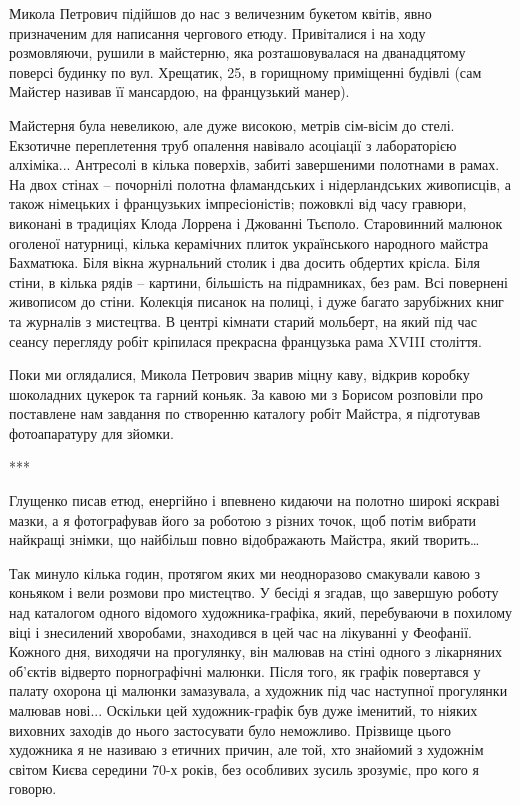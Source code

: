 Микола Петрович підійшов до нас з величезним букетом квітів, явно призначеним
для написання чергового етюду. Привіталися і на ходу розмовляючи, рушили в
майстерню, яка розташовувалася на дванадцятому поверсі будинку по вул.
Хрещатик, 25, в горищному приміщенні будівлі (сам Майстер називав її мансардою,
на французький манер).


Майстерня була невеликою, але дуже високою, метрів сім-вісім до стелі.
Екзотичне переплетення труб опалення навівало асоціації з лабораторією
алхіміка... Антресолі в кілька поверхів, забиті завершеними полотнами в рамах.
На двох стінах – почорнілі полотна фламандських і нідерландських живописців, а
також німецьких і французьких імпресіоністів; пожовклі від часу гравюри,
виконані в традиціях Клода Лоррена і Джованні Тьєполо. Старовинний малюнок
оголеної натурниці, кілька керамічних плиток українського народного майстра
Бахматюка. Біля вікна журнальний столик і два досить обдертих крісла. Біля
стіни, в кілька рядів – картини, більшість на підрамниках, без рам. Всі
повернені живописом до стіни. Колекція писанок на полиці, і дуже багато
зарубіжних книг та журналів з мистецтва. В центрі кімнати старий мольберт, на
який під час сеансу перегляду робіт кріпилася прекрасна французька рама XVIII
століття.

Поки ми оглядалися, Микола Петрович зварив міцну каву, відкрив коробку
шоколадних цукерок та гарний коньяк. За кавою ми з Борисом розповіли про
поставлене нам завдання по створенню каталогу робіт Майстра, я підготував
фотоапаратуру для зйомки.

***

Глущенко писав етюд, енергійно і впевнено кидаючи на полотно широкі яскраві
мазки, а я фотографував його за роботою з різних точок, щоб потім вибрати
найкращі знімки, що найбільш повно відображають Майстра, який творить…

Так минуло кілька годин, протягом яких ми неодноразово смакували кавою з
коньяком і вели розмови про мистецтво. У бесіді я згадав, що завершую роботу
над каталогом одного відомого художника-графіка, який, перебуваючи в похилому
віці і знесилений хворобами, знаходився в цей час на лікуванні у Феофанії.
Кожного дня, виходячи на прогулянку, він малював на стіні одного з лікарняних
об'єктів відверто порнографічні малюнки. Після того, як графік повертався у
палату охорона ці малюнки замазувала, а художник під час наступної прогулянки
малював нові... Оскільки цей художник-графік був дуже іменитий, то ніяких
виховних заходів до нього застосувати було неможливо. Прізвище цього художника
я не називаю з етичних причин, але той, хто знайомий з художнім світом Києва
середини 70-х років, без особливих зусиль зрозуміє, про кого я говорю.

